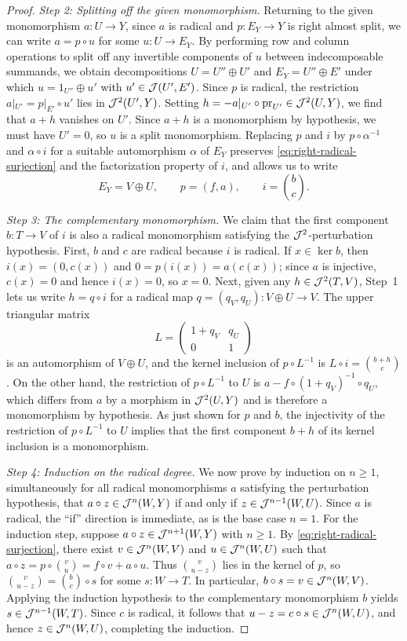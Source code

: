 \begin{proof}
\emph{Step 2: Splitting off the given monomorphism.}
Returning to the given monomorphism $a:U\to Y$, since $a$ is radical and
$p:E_Y\to Y$ is right almost split, we can write $a=p\circ u$ for some
$u:U\to E_Y$. By performing row and column operations to split off any
invertible components of $u$ between indecomposable summands, we obtain
decompositions $U=U''\oplus U'$ and $E_Y=U''\oplus E'$ under which
$u=1_{U''}\oplus u'$ with $u'\in \mathcal J(U',E')$. Since $p$ is radical, the
restriction $a|_{U'}=p|_{E'}\circ u'$ lies in $\mathcal J^2(U',Y)$. Setting
$h=-a|_{U'}\circ\operatorname{pr}_{U'}\in \mathcal J^2(U,Y)$, we find that $a+h$
vanishes on $U'$. Since $a+h$ is a monomorphism by hypothesis, we must have
$U'=0$, so $u$ is a split monomorphism. Replacing $p$ and $i$ by
$p\circ\alpha^{-1}$ and $\alpha\circ i$ for a suitable automorphism $\alpha$
of $E_Y$ preserves \eqref{eq:right-radical-surjection} and the factorization
property of $i$, and allows us to write
\[
 E_Y=V\oplus U,\qquad p=(f,a),\qquad i=\binom b c.
\]

\emph{Step 3: The complementary monomorphism.}
We claim that the first component $b:T\to V$ of $i$ is also a radical
monomorphism satisfying the $\mathcal J^2$-perturbation hypothesis. First, $b$ and $c$
are radical because $i$ is radical. If $x\in\ker b$, then $i(x)=(0,c(x))$
and $0=p(i(x))=a(c(x))$; since $a$ is injective, $c(x)=0$ and hence
$i(x)=0$, so $x=0$. Next, given any $h\in \mathcal J^2(T,V)$, Step~1 lets us write
$h=q\circ i$ for a radical map $q=(q_V,q_U):V\oplus U\to V$. The upper
triangular matrix
\[
 L=\begin{pmatrix}1+q_V&q_U\\0&1\end{pmatrix}
\]
is an automorphism of $V\oplus U$, and the kernel inclusion of
$p\circ L^{-1}$ is $L\circ i=\binom{b+h}{c}$. On the other hand, the
restriction of $p\circ L^{-1}$ to $U$ is
$a-f\circ(1+q_V)^{-1}\circ q_U$, which differs from $a$ by a morphism in
$\mathcal J^2(U,Y)$ and is therefore a monomorphism by hypothesis. As just shown for
$p$ and $b$, the injectivity of the restriction of $p\circ L^{-1}$ to $U$
implies that the first component $b+h$ of its kernel inclusion is a
monomorphism.

\emph{Step 4: Induction on the radical degree.}
We now prove by induction on $n\geq1$, simultaneously for all radical
monomorphisms $a$ satisfying the perturbation hypothesis, that
$a\circ z\in \mathcal J^n(W,Y)$ if and only if $z\in \mathcal J^{n-1}(W,U)$. Since $a$ is
radical, the ``if'' direction is immediate, as is the base case $n=1$. For
 the induction step, suppose $a\circ z\in \mathcal J^{n+1}(W,Y)$ with $n\geq1$. By
\eqref{eq:right-radical-surjection}, there exist $v\in \mathcal J^n(W,V)$ and
$u\in \mathcal J^n(W,U)$ such that $a\circ z=p\circ\binom{v}{u}=f\circ v+a\circ u$.
Thus $\binom{v}{u-z}$ lies in the kernel of $p$, so
$\binom{v}{u-z}=\binom{b}{c}\circ s$ for some $s:W\to T$. In particular,
$b\circ s=v\in \mathcal J^n(W,V)$. Applying the induction hypothesis to the
complementary monomorphism $b$ yields $s\in \mathcal J^{n-1}(W,T)$. Since $c$ is
radical, it follows that $u-z=c\circ s\in \mathcal J^n(W,U)$, and hence
$z\in \mathcal J^n(W,U)$, completing the induction.
\end{proof}

